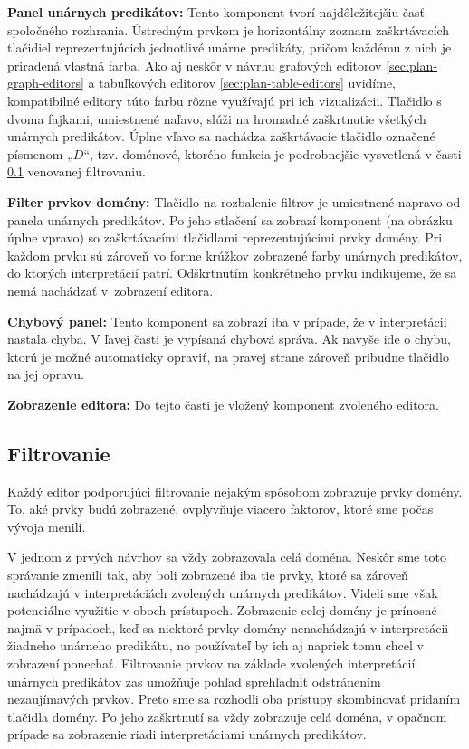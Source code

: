 \textbf{Panel unárnych predikátov:} Tento komponent tvorí najdôležitejšiu časť spoločného rozhrania. Ústredným prvkom je horizontálny zoznam zaškrtávacích tlačidiel reprezentujúcich jednotlivé unárne predikáty, pričom každému z nich je priradená vlastná farba. Ako aj neskôr v návrhu grafových editorov \ref{sec:plan-graph-editors} a tabuľkových editorov \ref{sec:plan-table-editors} uvidíme, kompatibilné editory túto farbu rôzne využívajú pri ich vizualizácii. Tlačidlo s dvoma fajkami, umiestnené naľavo, slúži na hromadné zaškrtnutie všetkých unárnych predikátov. Úplne vľavo sa nachádza zaškrtávacie tlačidlo označené písmenom „$D$“, tzv. doménové, ktorého funkcia je podrobnejšie vysvetlená v časti \ref{sec:plan-editors-ui-filters} venovanej filtrovaniu.

\textbf{Filter prvkov domény:}
Tlačidlo na rozbalenie filtrov je umiestnené napravo od panela unárnych predikátov. Po jeho stlačení sa zobrazí komponent (na obrázku úplne vpravo) so zaškrtávacími tlačidlami reprezentujúcimi prvky domény. Pri každom prvku sú zároveň vo forme krúžkov zobrazené farby unárnych predikátov, do ktorých interpretácií patrí. Odškrtnutím konkrétneho prvku indikujeme, že sa nemá nachádzať v~zobrazení editora.

\textbf{Chybový panel:} Tento komponent sa zobrazí iba v prípade, že v interpretácii nastala chyba. V ľavej časti je vypísaná chybová správa. Ak navyše ide o chybu, ktorú je možné automaticky opraviť, na pravej strane zároveň pribudne tlačidlo na jej opravu.

\textbf{Zobrazenie editora:} Do tejto časti je vložený komponent zvoleného editora.

\subsection{Filtrovanie}
\label{sec:plan-editors-ui-filters}
Každý editor podporujúci filtrovanie nejakým spôsobom zobrazuje prvky domény. To, aké prvky budú zobrazené, ovplyvňuje viacero faktorov, ktoré sme počas vývoja menili.

V jednom z prvých návrhov sa vždy zobrazovala celá doména. Neskôr sme toto správanie zmenili tak, aby boli zobrazené iba tie prvky, ktoré sa zároveň nachádzajú v interpretáciách zvolených unárnych predikátov. Videli sme však potenciálne využitie v oboch prístupoch. Zobrazenie celej domény je prínosné najmä v prípadoch, keď sa niektoré prvky domény nenachádzajú v interpretácii žiadneho unárneho predikátu, no používateľ by ich aj napriek tomu chcel v zobrazení ponechať. Filtrovanie prvkov na základe zvolených interpretácií unárnych predikátov zas umožňuje pohľad sprehľadniť odstránením nezaujímavých prvkov. Preto sme sa rozhodli oba prístupy skombinovať pridaním tlačidla domény. Po jeho zaškrtnutí sa vždy zobrazuje celá doména, v opačnom prípade sa zobrazenie riadi interpretáciami unárnych predikátov.

